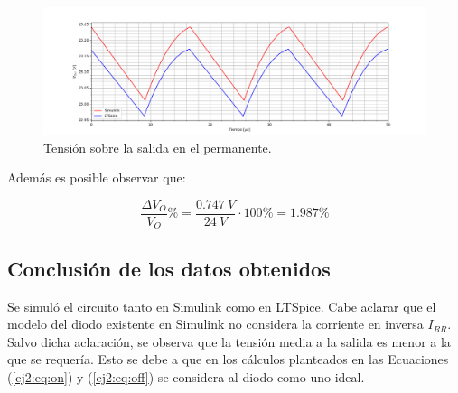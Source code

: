 \begin{figure}[H]
	\centering
	\includegraphics[width=\linewidth]{ImagenesEjercicio-2/vout.png}
	\caption{Tensión sobre la salida en el permanente.}
	\label{fig:ej2:vout}
\end{figure}

Además es posible observar que:

\begin{equation*}
\frac{\Delta V_O}{V_O} \% = \frac{0.747 \ V}{24 \ V} \cdot 100 \% = 1.987 \%
\end{equation*}

\subsection{Conclusión de los datos obtenidos}

Se simuló el circuito tanto en Simulink como en LTSpice. Cabe aclarar que el modelo del diodo existente en Simulink no considera la corriente en inversa $I_{RR}$. Salvo dicha aclaración, se observa que la tensión media a la salida es menor a la que se requería. Esto se debe a que en los cálculos planteados en las Ecuaciones (\ref{ej2:eq:on}) y (\ref{ej2:eq:off}) se considera al diodo como uno ideal.

